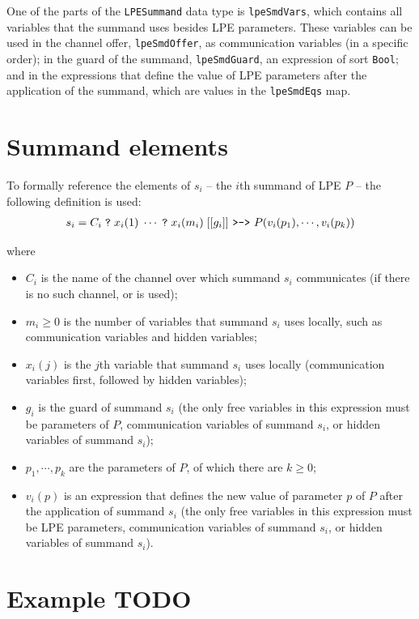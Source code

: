 One of the parts of the \texttt{LPESummand} data type is \texttt{lpeSmdVars}, which contains all variables that the summand uses besides LPE parameters.
These variables can be used in the channel offer, \texttt{lpeSmdOffer}, as communication variables (in a specific order); in the guard of the summand, \texttt{lpeSmdGuard}, an expression of sort \texttt{Bool}; and in the expressions that define the value of LPE parameters after the application of the summand, which are values in the \texttt{lpeSmdEqs} map.

\section{Summand elements} \label{summandelements}

To formally reference the elements of $s_i$ -- the $i$th summand of LPE $P$ -- the following definition is used:
\begin{align*}
s_i = C_i \; \texttt{?} \; x_i(1) \; \cdots{} \; \texttt{?} \; x_i(m_i) \; [[g_i]] \text{ \texttt{>->} } P(v_i(p_1), \cdots{}, v_i(p_k))
\end{align*}

where

\begin{itemize}
\item $C_i$ is the name of the channel over which summand $s_i$ communicates (if there is no such channel, \istep{} or \cistep{} is used);
\item $m_i \geq 0$ is the number of variables that summand $s_i$ uses locally, such as communication variables and hidden variables;
\item $x_i(j)$ is the $j$th variable that summand $s_i$ uses locally (communication variables first, followed by hidden variables);
\item $g_i$ is the guard of summand $s_i$ (the only free variables in this expression must be parameters of $P$, communication variables of summand $s_i$, or hidden variables of summand $s_i$);
\item $p_1, \cdots{}, p_k$ are the parameters of $P$, of which there are $k \geq 0$;
\item $v_i(p)$ is an expression that defines the new value of parameter $p$ of $P$ after the application of summand $s_i$ (the only free variables in this expression must be LPE parameters, communication variables of summand $s_i$, or hidden variables of summand $s_i$).
\end{itemize}

\section{Example TODO}

